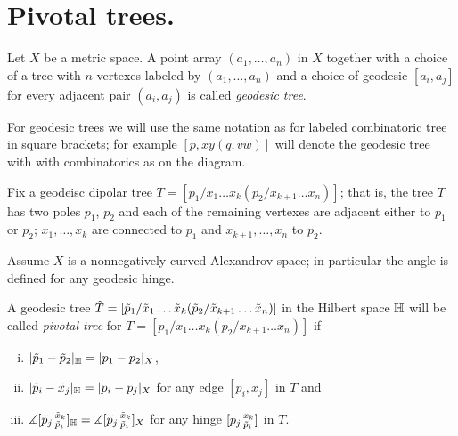 \section{Pivotal trees.}

Let $X$ be a metric space.
A point array $(a_1,\dots,a_n)$ in $X$ together with a choice of a tree with $n$ vertexes labeled by  $(a_1,\dots,a_n)$ and a choice of geodesic $[a_i,a_j]$ for every adjacent pair $(a_i,a_j)$ is called \emph{geodesic tree}.

\hide
\begin{wrapfigure}{r}{15 mm}
\end{wrapfigure}
\unhide

For geodesic trees we will use the same notation as for labeled combinatoric tree in square brackets; for example $[p,xy(q,vw)]$ will denote the geodesic tree with with combinatorics as on the diagram. 

Fix a geodeisc dipolar tree $T=[p_1/x_1\dots x_k(p_2/x_{k+1}\dots x_n)]$;
that is, the tree $T$ has two poles $p_1$, $p_2$ and each of the remaining vertexes are adjacent either to $p_1$ or $p_2$;  $x_1,\dots, x_k$ are connected to $p_1$ and $x_{k+1},\dots, x_n$ to $p_2$.

Assume $X$ is a nonnegatively curved Alexandrov space;
in particular the angle is defined for any geodesic hinge. 

A geodesic tree  $\~T=[\~p_1/\~x_1\dots \~x_k(\~p_2/\~x_{k+1}\dots \~x_n)]$ in the Hilbert space $\HH$ will be called \emph{pivotal tree} for $T=[p_1/x_1\dots x_k(p_2/x_{k+1}\dots x_n)]$
if 
\begin{enumerate}[(i)]
\item $|\~p_1-\~p_2|_\HH= |p_1-p_2|_X$,
\item $|\~p_i-\~x_j|_\HH= |p_i-p_j|_X$ for any edge $[p_i,x_j]$ in $T$ and
\item $\measuredangle[\~p_j\,^{\~x_k}_{\~p_i}]_{\HH}=\measuredangle[\~p_j\,^{\~x_k}_{\~p_i}]_X$
for any hinge  $[p_j\,^{x_k}_{\~p_i}]$ in $T$.
\end{enumerate}



